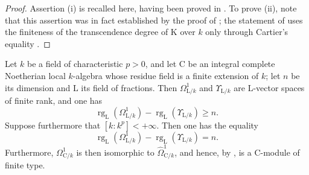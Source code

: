 \begin{proof}
Assertion (i) is recalled here, having been proved in .
To prove (ii), note that this assertion was in fact established by the proof of ; the statement of  uses the finiteness of the transcendence degree of $\mathrm{K}$ over $k$ only through Cartier's equality .
\end{proof}

\begin{lemma}[18.11.2]
\label{IV.18.11.2}
Let $k$ be a field of characteristic $p>0$, and let $\mathrm{C}$ be an integral complete Noetherian local $k$-algebra whose residue field is a finite extension of $k$; let $n$ be its dimension and $\mathrm{L}$ its field of fractions.
Then $\Omega^1_{\mathrm{L}/k}$ and $\Upsilon_{\mathrm{L}/k}$ are $\mathrm{L}$-vector spaces of finite rank, and one has
\begin{equation}
\label{IV.18.11.2.1}
\tag{18.11.2.1}
  \operatorname{rg}_{\mathrm{L}}(\Omega^1_{\mathrm{L}/k})-\operatorname{rg}_{\mathrm{L}}(\Upsilon_{\mathrm{L}/k})\geq n.
\end{equation}
Suppose furthermore that $[k:k^p]<+\infty$.
Then one has the equality
\begin{equation}
\label{IV.18.11.2.2}
\tag{18.11.2.2}
  \operatorname{rg}_{\mathrm{L}}(\Omega^1_{\mathrm{L}/k})-\operatorname{rg}_{\mathrm{L}}(\Upsilon_{\mathrm{L}/k})=n.
\end{equation}
Furthermore, $\Omega^1_{\mathrm{C}/k}$ is then isomorphic to $\hat{\Omega}^1_{\mathrm{C}/k}$, and hence, by , is a $\mathrm{C}$-module of finite type.
\end{lemma}

